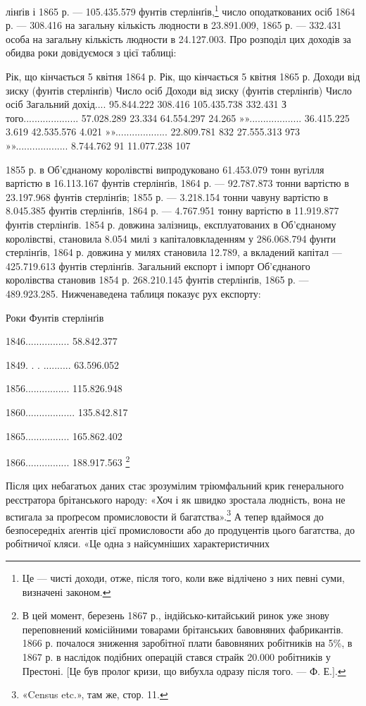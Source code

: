 лінґів і 1865 р. — 105.435.579 фунтів стерлінґів,\footnote{
Це — чисті доходи, отже, після того, коли вже відлічено з них
певні суми, визначені законом.
} число оподаткованих
осіб 1864 р. — 308.416 на загальну кількість людности в
23.891.009, 1865 р. — 332.431 особа на загальну кількість людности
в 24.127.003. Про розподіл цих доходів за обидва роки
довідуємося з цієї таблиці:

    Рік, що кінчається 5 квітня 1864 р. Рік, що кінчається 5 квітня 1865 р.
    Доходи від зиску (фунтів стерлінґів) Число  осіб    Доходи від зиску (фунтів стерлінґів) Число 
осіб
Загальний дохід....  95.844.222   308.416   105.435.738   332.431
З того....................  57.028.289   23.334      64.554.297     24.265
»»...................  36.415.225   3.619        42.535.576     4.021
»»...................  22.809.781   832           27.555.313     973
»»...................  8.744.762      91             11.077.238     107

1855 р. в Об’єднаному королівстві випродуковано 61.453.079
тонн вугілля вартістю в 16.113.167 фунтів стерлінґів, 1864 р. —
92.787.873 тонни вартістю в 23.197.968 фунтів стерлінґів; 1855 р. —
3.218.154 тонни чавуну вартістю в 8.045.385 фунтів стерлінґів,
1864 р. — 4.767.951 тонну вартістю в 11.919.877 фунтів стерлінґів.
1854 р. довжина залізниць, експлуатованих в Об’єднаному
королівстві, становила 8.054 милі з капіталовкладенням
у 286.068.794 фунти стерлінґів, 1864 р. довжина у милях становила
12.789, а вкладений капітал — 425.719.613 фунтів стерлінґів.
Загальний експорт і імпорт Об’єднаного королівства
становив 1854 р. 268.210.145 фунтів стерлінґів, 1865 р. —
489.923.285. Нижченаведена таблиця показує рух експорту:

Роки    Фунтів стерлінґів

1846................ 58.842.377

1849. . . .......... 63.596.052

1856................ 115.826.948

1860.................. 135.842.817

1865................ 165.862.402

1866................ 188.917.563 \footnote{
В цей момент, березень 1867 р., індійсько-китайський ринок
уже знову переповнений комісійними товарами брітанських бавовняних
фабрикантів. 1866 р. почалося зниження заробітної плати бавовняних
робітників на 5\%, в 1867 р. в наслідок подібних операцій стався страйк
20.000 робітників у Престоні. [Це був пролог кризи, що вибухла одразу
після того. — Ф. Е.].
}

Після цих небагатьох даних стає зрозумілим тріюмфальний
крик генерального реєстратора брітанського народу: «Хоч і
як швидко зростала людність, вона не встигала за проґресом промисловости
й багатства».\footnote{
«Census etc.», там же, стор. 11.
} А тепер вдаймося до безпосередніх
аґентів цієї промисловости або до продуцентів цього багатства,
до робітничої кляси. «Це одна з найсумніших характеристичних